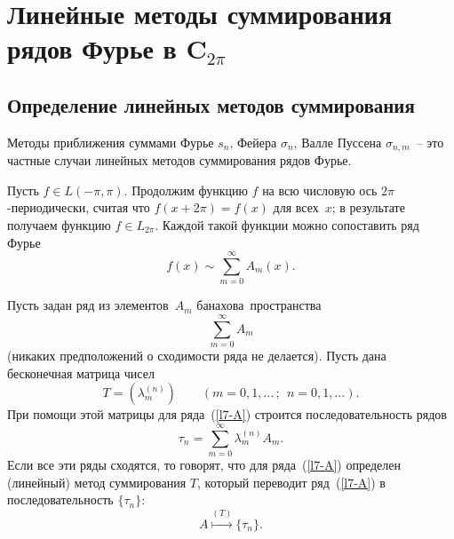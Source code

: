 
\chapter{Линейные методы суммирования рядов Фурье в $\boldsymbol C_{2\pi}$} %

\section{Определение линейных методов суммирования}

Методы приближения суммами Фурье $s_n$, Фейера $\sigma_n$, Валле Пуссена
$\sigma_{n,m}$~-- это частные случаи линейных методов суммирования рядов Фурье.

{Пусть $f\in L(-\pi,\pi)$. Продолжим функцию $f$ на всю числовую ось $2\pi$-периодически,
считая что $f(x+2\pi)=f(x)$ для всех~$x$; в
результате получаем функцию $f\in L_{2\pi}$.} Каждой такой функции можно сопоставить ряд Фурье
$$
f(x)\sim \sum\limits_{m=0}^{\infty} A_m(x).
$$

\begin{defi}
Пусть задан ряд из элементов~$A_m$ банахова~пространства
\begin{equation}\label{l7-A}
\sum\limits_{m=0}^{\infty} A_m
\end{equation}
(никаких предположений о сходимости ряда не делается). Пусть дана бесконечная матрица чисел
$$
T=(\lambda_m^{(n)})\qquad (m=0,1,\ldots\,;\ \  n=0,1,\ldots).
$$
При помощи этой матрицы для ряда~(\ref{l7-A}) строится последовательность рядов
$$
\tau_n=\sum\limits_{m=0}^{\infty} \lambda_m^{(n)} A_m.
$$
Если все эти ряды сходятся, то говорят, что для ряда~(\ref{l7-A}) определен
(линейный)
метод суммирования $T$, который переводит ряд~(\ref{l7-A}) в последовательность
$\{\tau_n\}$:
$$
A \stackrel{(T)}{\longmapsto} \{\tau_n\}.
$$
\end{defi}

